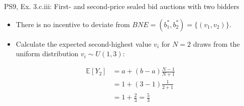 \begin{frame}{PS9, Ex. 3.c.iii: First- and second-price sealed bid auctions with two bidders}
\begin{multicols}{2}
      \vspace{-18pt}
      \begin{itemize}
        \item[(ii)] There is no incentive to deviate from $BNE=(b_1^*,b_2^*)=\{(v_1,v_2)\}$.
        \item[(iii)] Calculate the expected second-highest value $v_i$ for $N=2$ draws from the uniform distribution $v_i\sim U(1,3)$:
      \end{itemize}
      \vspace{-8pt}
      \begin{align*}
        \mathbb{E}[Y_2]&=a+(b-a)\frac{N-1}{N+1}\\
                       &=1+(3-1)\frac{1}{2+1}\\
                       &=1+\frac{2}{3}=\frac{5}{3}
      \end{align*}
      \vfill\null
    \end{multicols}
\end{frame}
